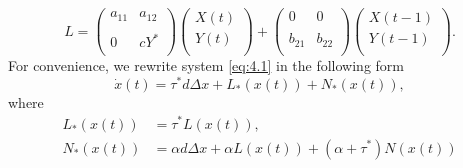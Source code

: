 \documentclass[10pt]{amsart}
\theoremstyle{definition}
\begin{document}
$$L=\left(
      \begin{array}{cc}
      {\displaystyle{a_{11}}} & {\displaystyle{a_{12}}} \\ \\
      {\displaystyle{0}} & {\displaystyle{cY^*}} \\
    \end{array}
    \right)
					\left(
         \begin{array}{c}
         {\displaystyle{X(t)}}\\
         {\displaystyle{Y(t)}}\\
         \end{array}
		     \right)
		   + \left(
       \begin{array}{cc}
       {\displaystyle{0}} & {\displaystyle{0}}\\ \\
     {\displaystyle{b_{21}}} & {\displaystyle{b_{22}}}\\
    \end{array}
    \right)
				\left(
            \begin{array}{c}
             {\displaystyle{X(t-1)}}\\
             {\displaystyle{Y(t-1)}}\\
            \end{array}
     \right).$$
For convenience, we rewrite system \eqref{eq:4.1} in the following form
\begin{equation}\label{eq:4.2}
{\dot x}(t)=\tau^* d \Delta x + L_*(x(t))+N_*(x(t)),
\end{equation}
where
\begin{align*}
L_*(x(t))&=\tau^* L(x(t)),\\
N_*(x(t))&=\alpha d \Delta x + \alpha L(x(t))+(\alpha+\tau^*)N(x(t))
\end{align*}
\end{document}
